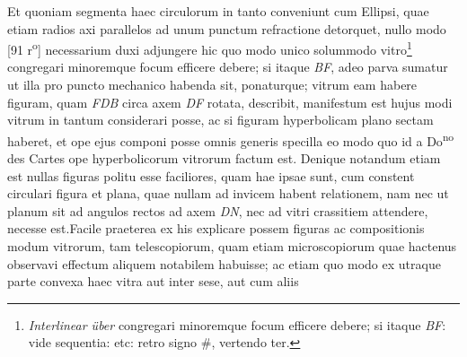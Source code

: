 \pstart  Et quoniam segmenta haec circulorum in tanto conveniunt cum Ellipsi, quae etiam radios axi parallelos  ad unum punctum refractione detorquet, nullo modo 
[91 r\textsuperscript{o}] necessarium duxi adjungere hic quo modo unico solummodo vitro\footnote{\textit{Interlinear \"{u}ber} congregari minoremque focum efficere debere; si itaque \textit{BF}: \protect{} vide sequentia:  etc: retro signo \#, vertendo ter.} congregari minoremque focum efficere debere; si itaque \textit{BF}, adeo parva sumatur ut illa pro puncto mechanico\protect{} habenda sit, ponaturque; vitrum eam habere figuram, quam \textit{FDB} circa axem \textit{DF} rotata, describit, manifestum est hujus modi vitrum in tantum considerari posse, ac si figuram hyperbolicam plano sectam haberet, et ope ejus componi posse omnis generis specilla\protect{} eo modo quo id a Do\textsuperscript{no} des Cartes\protect{} ope hyperbolicorum vitrorum factum est. Denique notandum etiam est nullas figuras politu esse faciliores, quam hae ipsae sunt, cum constent circulari figura et plana, quae nullam ad invicem habent relationem, nam nec ut planum sit ad angulos rectos ad axem \textit{DN}, nec ad vitri crassitiem attendere, necesse est.\pend \pstart Facile praeterea ex his explicare possem figuras ac compositionis modum vitrorum, tam telescopiorum\protect{}, quam etiam microscopiorum\protect{} quae hactenus observavi effectum aliquem notabilem habuisse; ac etiam quo modo ex utraque parte convexa haec vitra aut inter sese, aut cum aliis